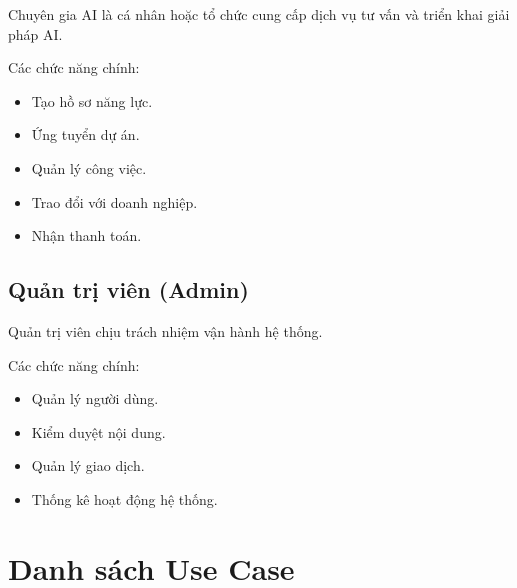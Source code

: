 Chuyên gia AI là cá nhân hoặc tổ chức cung cấp dịch vụ tư vấn và triển khai giải pháp AI.

Các chức năng chính:

\begin{itemize}
    \item Tạo hồ sơ năng lực.
    \item Ứng tuyển dự án.
    \item Quản lý công việc.
    \item Trao đổi với doanh nghiệp.
    \item Nhận thanh toán.
\end{itemize}

\subsection{Quản trị viên (Admin)}

Quản trị viên chịu trách nhiệm vận hành hệ thống.

Các chức năng chính:

\begin{itemize}
    \item Quản lý người dùng.
    \item Kiểm duyệt nội dung.
    \item Quản lý giao dịch.
    \item Thống kê hoạt động hệ thống.
\end{itemize}

\section{Danh sách Use Case}

